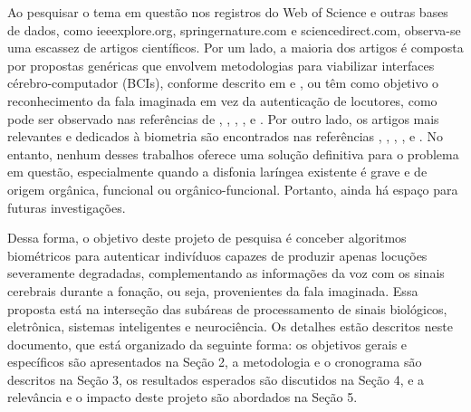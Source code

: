 \documentclass[a4paper,12pt,openright,oneside]{book}
\newenvironment{myenv}[1]
  {\begin{spacing}{#1}}
  {\end{spacing}}
\begin{document}
\begin{myenv}{1.5}
			\par Ao pesquisar o tema em questão nos registros do Web of Science e outras bases de dados, como ieeexplore.org, springernature.com e sciencedirect.com, observa-se uma escassez de artigos científicos. Por um lado, a maioria dos artigos é composta por propostas genéricas que envolvem metodologias para viabilizar interfaces cérebro-computador (BCIs), conforme descrito em \cite{rusnac2021eeg} e \cite{brigham2010imagined}, ou têm como objetivo o reconhecimento da fala imaginada em vez da autenticação de locutores, como pode ser observado nas referências de \cite{pawar2022wavelet}, \cite{cooney2021bimodal}, \cite{lopez2022state}, \cite{bakhshali2022investigating}, \cite{lee2021decoding} e \cite{tamm2020classification}. Por outro lado, os artigos mais relevantes e dedicados à biometria são encontrados nas referências \cite{moctezuma2019subjects}, \cite{moctezuma2018eeg}, \cite{jayarathne2016brainid}, \cite{jayarathne2017survey}, \cite{del2014electroencephalogram} e \cite{ruiz2016cerebre}. No entanto, nenhum desses trabalhos oferece uma solução definitiva para o problema em questão, especialmente quando a disfonia laríngea existente é grave e de origem orgânica, funcional ou orgânico-funcional. Portanto, ainda há espaço para futuras investigações.
			
			\par Dessa forma, o objetivo deste projeto de pesquisa é conceber algoritmos biométricos para autenticar indivíduos capazes de produzir apenas locuções severamente degradadas, complementando as informações da voz com os sinais cerebrais durante a fonação, ou seja, provenientes da fala imaginada. Essa proposta está na interseção das subáreas de processamento de sinais biológicos, eletrônica, sistemas inteligentes e neurociência. Os detalhes estão descritos neste documento, que está organizado da seguinte forma: os objetivos gerais e específicos são apresentados na Seção 2, a metodologia e o cronograma são descritos na Seção 3, os resultados esperados são discutidos na Seção 4, e a relevância e o impacto deste projeto são abordados na Seção 5.
		\end{myenv}
\end{document}
